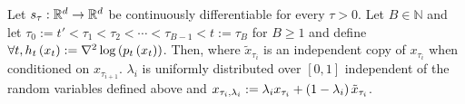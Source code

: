\begin{lemma}\label{lemma:conditional_decomposition}
Let $s_\tau:\mathbb{R}^d \to \mathbb{R}^d$ be continuously differentiable for every $\tau > 0$. 
Let $B \in \mathbb{N}$ and let $\tau_{0} := t' < \tau_{1} < \tau_{2} < \cdots < \tau_{B-1} < t := \tau_{B}$ for $B \geq 1$ and define $\forall t, h_{t}\left(x_t\right) := \nabla^{2}\log\left(p_{t}\left(x_t\right)\right)$. Then, 
    where  $\tilde{x}_{\tau_i}$ is an independent copy of $x_{\tau_i}$ when conditioned on $x_{\tau_{i+1}}$. $\lambda_i$ is uniformly distributed over $[0,1]$ independent of the random variables defined above and $x_{\tau_i,\lambda_i} := \lambda_{i}x_{\tau_i} + \left(1-\lambda_i\right)\tilde{x}_{\tau_i}$.
\end{lemma}
